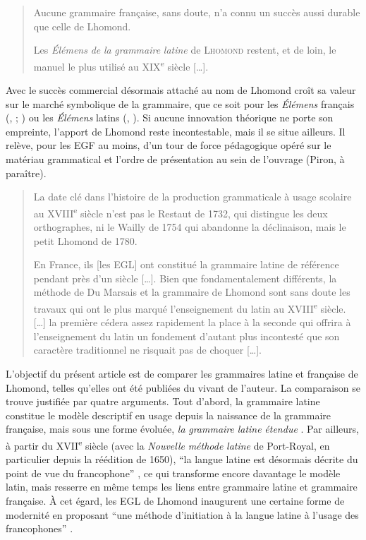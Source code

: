 \documentclass[output=paper]{langsci/langscibook}
\begin{document}
\begin{quote}
    Aucune grammaire française, sans doute, n’a connu un succès aussi durable que celle de Lhomond. \citep[63]{chervel_et_1977}

    Les \textit{Élémens} \textit{de} \textit{la} \textit{grammaire} \textit{latine} de \textsc{Lhomond} restent, et de loin, le manuel le plus utilisé au XIX\textsuperscript{e} siècle […]. \citep[16]{chervel_rhetorique_1979}
\end{quote}

Avec le succès commercial désormais attaché au nom de Lhomond croît sa valeur sur le marché symbolique de la grammaire, que ce soit pour les \textit{Élémens} français (\citealt{chervel_et_1977}, \citeyear{chervel_histoire_2006}; \citealt{colombat_histoire_2010}) ou les \textit{Élémens} latins (\citealt{chervel_et_1977}, \citealt{colombat_grammaire_1999}). Si aucune innovation théorique ne porte son empreinte, l’apport de Lhomond reste incontestable, mais il se situe ailleurs. Il relève, pour les EGF au moins, d’un tour de force pédagogique opéré sur le matériau grammatical et l’ordre de présentation au sein de l’ouvrage (Piron, à paraître). 

\begin{quote}
La date clé dans l’histoire de la production grammaticale à usage scolaire au XVIII\textsuperscript{e} siècle n’est pas le Restaut de 1732, qui distingue les deux orthographes, ni le Wailly de 1754 qui abandonne la déclinaison, mais le petit Lhomond de 1780. \citep[220]{chervel_histoire_2006}

En France, ils [les EGL] ont constitué la grammaire latine de référence pendant près d’un siècle […]. Bien que fondamentalement différents, la méthode de Du Marsais et la grammaire de Lhomond sont sans doute les travaux qui ont le plus marqué l’enseignement du latin au XVIII\textsuperscript{e} siècle. […] la première cédera assez rapidement la place à la seconde qui offrira à l’enseignement du latin un fondement d’autant plus incontesté que son caractère traditionnel ne risquait pas de choquer […]. \citep[106]{colombat_grammaire_1999}
\end{quote}

L’objectif du présent article est de comparer les grammaires latine et française de Lhomond, telles qu’elles ont été publiées du vivant de l’auteur. La comparaison se trouve justifiée par quatre arguments. Tout d’abord, la grammaire latine constitue le modèle descriptif en usage depuis la naissance de la grammaire française, mais sous une forme évoluée, \textit{la} \textit{grammaire} \textit{latine} \textit{étendue} \citep{auroux_revolution_1994}. Par ailleurs, à partir du XVII\textsuperscript{e} siècle (avec la \textit{Nouvelle} \textit{méthode} \textit{latine} de Port-Royal, en particulier depuis la réédition de 1650), “la langue latine est désormais décrite du point de vue du francophone” \citep[11]{colombat_a_1995}, ce qui transforme encore davantage le modèle latin, mais resserre en même temps les liens entre grammaire latine et grammaire française. À cet égard, les EGL de Lhomond inaugurent une certaine forme de modernité en proposant “une méthode d’initiation à la langue latine à l’usage des francophones” \citep[166]{colombat_grammaire_1999}.
\end{document}
